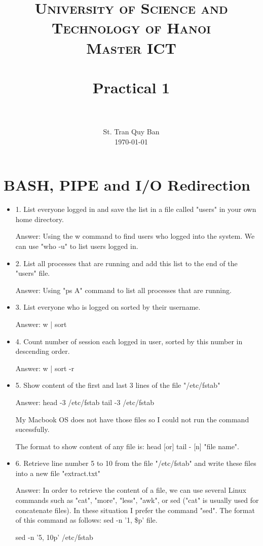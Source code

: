 \documentclass[paper=a4, fontsize=11pt]{scrartcl}
\title{
		\usefont{OT1}{bch}{b}{n}
		\normalfont \normalsize \textsc{University of Science and Technology of Hanoi \\ Master ICT} \\ [25pt]
		\horrule{0.5pt} \\[0.4cm]
		\huge Practical 1 \\
		\horrule{2pt} \\[0.5cm]
}
\author{
		\normalfont 								\normalsize
        St. Tran Quy Ban\\[-3pt]		\normalsize
        \today
}
\date{}
\numberwithin{equation}{section}		%
\numberwithin{figure}{section}			%
\numberwithin{table}{section}				%
\begin{document}
\maketitle

\section{BASH, PIPE and I/O Redirection}

\begin{itemize}
	\item 1. List everyone logged in and save the list in a file called "users" in your own home directory.
	
	Answer: Using the w command to find users who logged into the system. We can use "who -u" to list users logged in.
	\item 2. List all processes that are running and add this list to the end of the "users" file.
	
	Answer: Using "ps A" command to list all processes that are running.
	
	\item 3. List everyone who is logged on sorted by their username.
	
	Answer: w | sort
	
	\item 4. Count number of session each logged in user, sorted by this number in descending order.
	
	Answer: w | sort -r
	\item 5. Show content of the first and last 3 lines of the file "/etc/fstab"
	
	Answer:  
	head -3 /etc/fstab
	tail -3 /etc/fstab
	
	My Macbook OS does not have those files so I could not run the command sucessfully.
	
	The format to show content of any file is: head [or] tail - [n] "file name".
	
	\item 6. Retrieve line number 5 to 10 from the file "/etc/fstab" and write these files into a new file "extract.txt"
	
	Answer: 
	In order to retrieve the content of a file, we can use several Linux commands such as "cat", "more", "less", "awk", or sed ("cat" is usually used for concatenate files).
	In these situation I prefer the command "sed". The format of this command as follows: sed -n '1, \$p' file.
	
	sed -n '5, 10p' /etc/fstab
	

\end{itemize}
\end{document}
